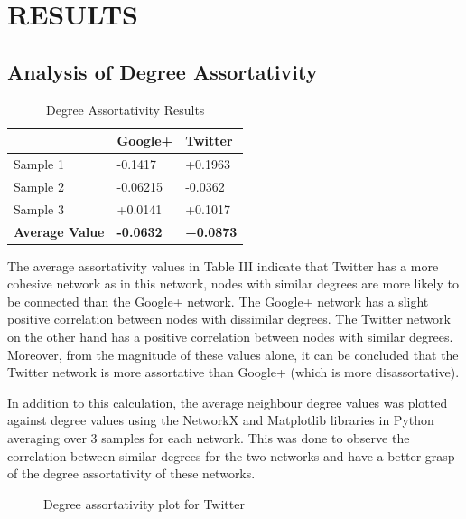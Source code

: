\documentclass[a4paper, 10pt, conference]{ieeeconf}      %
\begin{document}
\section{RESULTS}

\subsection{Analysis of Degree Assortativity}

\begin{table}[htb]
\caption{Degree Assortativity Results}
\begin{center}
\begin{tabular}{ | l | l | l |} 
\hline
& \textbf{Google+} & \textbf{Twitter}\\[0.5ex]
\hline
Sample 1 & -0.1417 & +0.1963\\
Sample 2 & -0.06215 & -0.0362\\
Sample 3 & +0.0141 & +0.1017\\[0.5ex]
\hline
\textbf{Average Value} & \textbf{-0.0632} & \textbf{+0.0873}\\[0.5ex]
\hline
\end{tabular}
\end{center}
\end{table}

The average assortativity values in Table III indicate that Twitter has a more cohesive network as in this network, nodes with similar degrees are more likely to be connected than the Google+ network. The Google+ network has a slight positive correlation between nodes with dissimilar degrees. The Twitter network on the other hand has a positive correlation between nodes with similar degrees. Moreover, from the magnitude of these values alone, it can be concluded that the Twitter network is more assortative than Google+ (which is more disassortative).

In addition to this calculation, the average neighbour degree values was plotted against degree values using the NetworkX and Matplotlib libraries in Python averaging over 3 samples for each network. This was done to observe the correlation between similar degrees for the two networks and have a better grasp of the degree assortativity of these networks.

\begin{figure}[thpb]
      \centering
      \caption{Degree assortativity plot for Twitter}
      \label{figurelabel}
   \end{figure}
   
\end{document}
